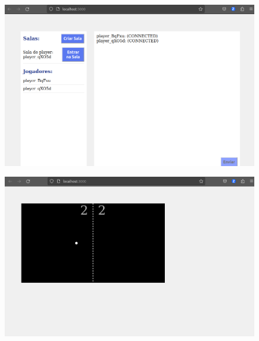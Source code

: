 \documentclass[12pt,openright,oneside,a4paper,brazil,article]{abntex2}
\begin{document}
\begin{enumerate}
    \begin{center}
      \begin{figure}
        \includegraphics[scale=0.5]{gamescreen1.png}
      \end{figure}  
    \end{center}
    

    \begin{center}
      \begin{figure}
        \includegraphics[scale=0.5]{gamescreen2.png}
      \end{figure}  
    \end{center}
  \end{enumerate}
\end{document}
